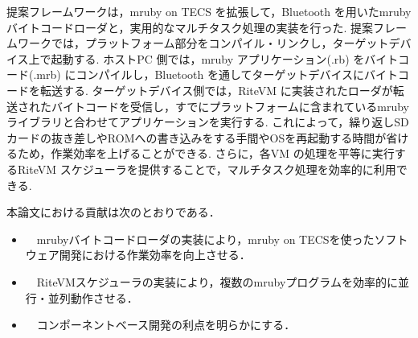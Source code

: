 \documentclass[submit]{ipsj_v2/UTF8/ipsj}
\begin{document}
提案フレームワークは，mruby on TECS を拡張して，Bluetooth を用いたmruby バイトコードローダと，実用的なマルチタスク処理の実装を行った.
提案フレームワークでは，プラットフォーム部分をコンパイル・リンクし，ターゲットデバイス上で起動する.
ホストPC 側では，mruby アプリケーション(.rb) をバイトコード(.mrb) にコンパイルし，Bluetooth を通してターゲットデバイスにバイトコードを転送する. 
ターゲットデバイス側では，RiteVM に実装されたローダが転送されたバイトコードを受信し，すでにプラットフォームに含まれているmruby ライブラリと合わせてアプリケーションを実行する.
これによって，繰り返しSDカードの抜き差しやROMへの書き込みをする手間やOSを再起動する時間が省けるため，作業効率を上げることができる.
さらに，各VM の処理を平等に実行するRiteVM スケジューラを提供することで，マルチタスク処理を効率的に利用できる.

本論文における貢献は次のとおりである．
\begin{itemize}
        \item　mrubyバイトコードローダの実装により，mruby on TECSを使ったソフトウェア開発における作業効率を向上させる．
        \item　RiteVMスケジューラの実装により，複数のmrubyプログラムを効率的に並行・並列動作させる．
        \item　コンポーネントベース開発の利点を明らかにする．
\end{itemize}
\end{document}
